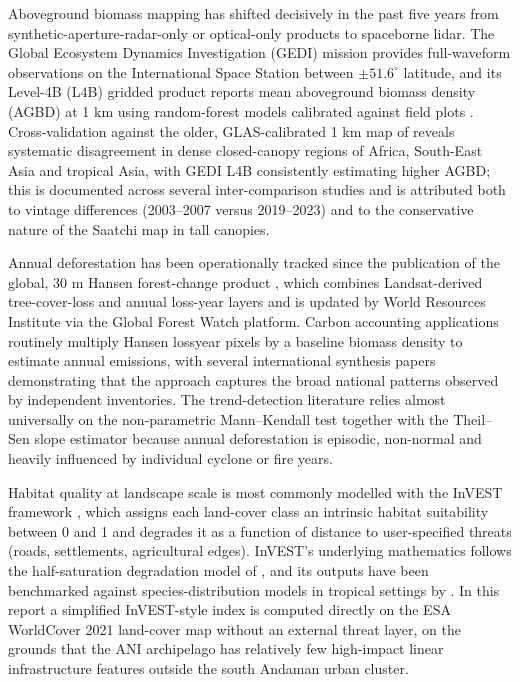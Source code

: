 \documentclass[12pt,a4paper]{article}
\begin{document}
Aboveground biomass mapping has shifted decisively in the past five
years from synthetic-aperture-radar-only or optical-only products to
spaceborne lidar. The Global Ecosystem Dynamics Investigation (GEDI)
mission \citep{dubayah2020} provides full-waveform observations on the
International Space Station between $\pm 51.6^\circ$ latitude, and its
Level-4B (L4B) gridded product reports mean aboveground biomass
density (AGBD) at 1 km using random-forest models calibrated against
field plots \citep{dubayah2022}. Cross-validation against the older,
GLAS-calibrated 1 km map of \citet{saatchi2011} reveals systematic
disagreement in dense closed-canopy regions of Africa, South-East Asia
and tropical Asia, with GEDI L4B consistently estimating higher AGBD;
this is documented across several inter-comparison studies and is
attributed both to vintage differences (2003--2007 versus 2019--2023)
and to the conservative nature of the Saatchi map in tall canopies.

Annual deforestation has been operationally tracked since the
publication of the global, 30 m Hansen forest-change product
\citep{hansen2013}, which combines Landsat-derived tree-cover-loss
and annual loss-year layers and is updated by World Resources
Institute via the Global Forest Watch platform. Carbon accounting
applications routinely multiply Hansen lossyear pixels by a baseline
biomass density to estimate annual emissions, with several
international synthesis papers \citep{harris2021} demonstrating that
the approach captures the broad national patterns observed by
independent inventories. The trend-detection literature relies almost
universally on the non-parametric Mann--Kendall test
\citep{mann1945, kendall1975} together with the Theil--Sen slope
estimator \citep{theil1950, sen1968} because annual deforestation is
episodic, non-normal and heavily influenced by individual cyclone or
fire years.

Habitat quality at landscape scale is most commonly modelled with the
InVEST framework \citep{sharp2020}, which assigns each land-cover
class an intrinsic habitat suitability between 0 and 1 and degrades
it as a function of distance to user-specified threats (roads,
settlements, agricultural edges). InVEST's underlying mathematics
follows the half-saturation degradation model of \citet{nelson2009},
and its outputs have been benchmarked against species-distribution
models in tropical settings by \citet{terrado2016}. In this report a
simplified InVEST-style index is computed directly on the ESA
WorldCover 2021 land-cover map without an external threat layer, on
the grounds that the ANI archipelago has relatively few high-impact
linear infrastructure features outside the south Andaman urban
cluster.
\end{document}
